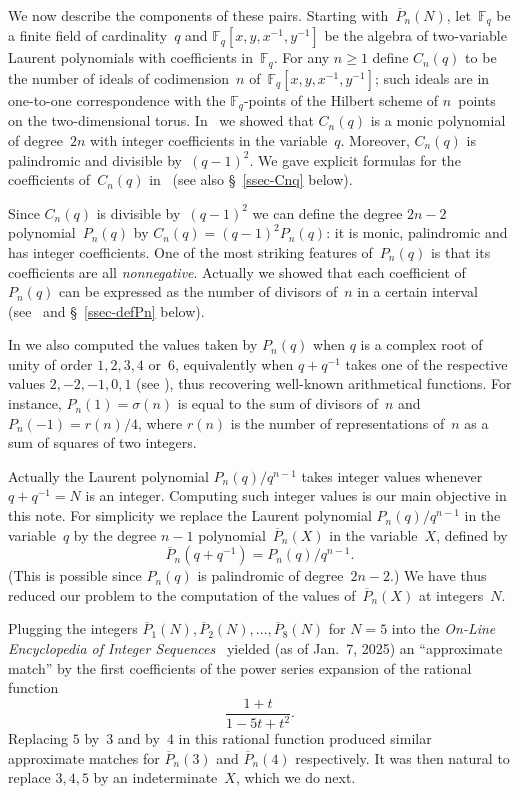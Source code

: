 \documentclass[11pt, a4paper]{amsart}
\theoremstyle{definition}
\newcommand\FF{\mathbb{F}}
\newcommand\Pg{\overline{P}}
\numberwithin{equation}{section}
\begin{document}
We now describe the components of these pairs. Starting with~$\Pg_n(N)$,
let~$\FF_q$ be a finite field of cardinality~$q$ and $\FF_q[x,y,x^{-1}, y^{-1}]$ be the algebra of
two-variable Laurent polynomials with coefficients in~$\FF_q$.
For any $n\geq 1$ define $C_n(q)$ to be the number of ideals of codimension~$n$ of~$\FF_q[x,y,x^{-1}, y^{-1}]$; 
such ideals are in one-to-one correspondence with the $\FF_q$-points of the Hilbert scheme 
of $n$~points on the two-dimensional torus.
In~\cite{KR2} we showed that $C_n(q)$ is a monic polynomial of degree~$2n$ with integer coefficients in the variable~$q$.
Moreover, $C_n(q)$ is palindromic and divisible by~$(q-1)^2$. 
We gave explicit formulas for the coefficients of~$C_n(q)$ in~\cite[Th.~1.1]{KR3} (see also \S~\ref{ssec-Cnq} below).

Since $C_n(q)$ is divisible by~$(q-1)^2$ we can define the degree $2n-2$ polynomial~$P_n(q)$ by $C_n(q) = (q-1)^2 P_n(q)$: 
it is monic, palindromic and has integer coefficients. 
One of the most striking features of~$P_n(q)$ is that its coefficients are all \emph{nonnegative}.
Actually we showed that each coefficient of~$P_n(q)$ can be expressed
as the number of divisors of~$n$ in a certain interval (see~\cite[Thm.~1.3]{KR3} and \S~\ref{ssec-defPn} below).

In \cite{KR1, KR3} we also computed the values taken by $P_n(q)$ when $q$ is a complex root of unity of order $1,2,3,4$ or~$6$, 
equivalently when $q + q^{-1}$ takes one of the respective values $2, -2, -1, 0, 1$ (see \cite[Thm.~1.6]{KR3}),
thus recovering well-known arithmetical functions. For instance, $P_n(1) = \sigma(n)$ is equal to the sum of divisors of~$n$
and $P_n(-1) = r(n)/4$, where $r(n)$ is the number of representations of~$n$ as a sum of squares of two integers.

Actually the Laurent polynomial ${P_n(q)}/{q^{n-1}}$ takes integer values whenever $q + q^{-1} = N$ is an integer.
Computing such integer values is our main objective in this note. 
For simplicity we replace the Laurent polynomial $P_n(q)/q^{n-1}$ in the variable~$q$ 
by the degree $n-1$ polynomial~$\Pg_n(X)$ 
in the variable~$X$, defined by
\begin{equation}\label{Pg-P}
\Pg_n(q + q^{-1}) = P_n(q)/q^{n-1} .
\end{equation}
(This is possible since $P_n(q)$ is palindromic of degree~$2n-2$.)
We have thus reduced our problem to the computation of the values of~$\Pg_n(X)$ at integers~$N$.

Plugging the integers $\Pg_1(N), \Pg_2(N),\ldots, \Pg_8(N)$ for $N=5$ into the 
\emph{On-Line Encyclopedia of Integer Sequences}~\cite{OEIS}
yielded  (as of Jan.~7, 2025)  
an ``approximate match'' by the first coefficients of the power series expansion of the rational function
\[
\frac{1+t}{1 - 5t + t^2}.
\]
Replacing $5$ by~$3$ and by~$4$ in this rational function produced similar approximate matches 
for $\Pg_n(3)$ and $\Pg_n(4)$ respectively.
It was then natural to replace $3,4,5$ by an indeterminate~$X$, which we do next.
\end{document}
